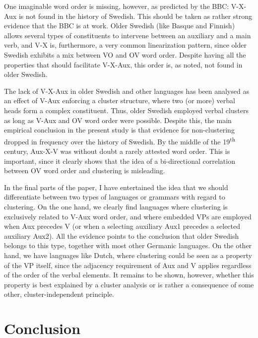 \documentclass[output=paper, colorlinks, citecolor=brown]{langscibook}
\begin{document}
One imaginable word order is missing, however, as predicted by the BBC: V-X-Aux is not found in the history of Swedish. This should be taken as rather strong evidence that the BBC is at work. Older Swedish (like Basque and Finnish) allows several types of constituents to intervene between an auxiliary and a main verb, and V-X is, furthermore, a very common linearization pattern, since older Swedish exhibits a mix between VO and OV word order. Despite having all the properties that should facilitate V-X-Aux, this order is, as noted, not found in older Swedish.



The lack of V-X-Aux in older Swedish and other languages has been analysed as an effect of V-Aux enforcing a cluster structure, where two (or more) verbal heads form a complex constituent. Thus, older Swedish employed verbal clusters as long as V-Aux and OV word order were possible. Despite this, the main empirical conclusion in the present study is that evidence for non-clustering dropped in frequency over the history of Swedish. By the middle of the 19\textsuperscript{th} century, Aux-X-V was without doubt a rarely attested word order. This is important, since it clearly shows that the idea of a bi-directional correlation between OV word order and clustering is misleading.



In the final parts of the paper, I have entertained the idea that we should differentiate between two types of languages or grammars with regard to clustering. On the one hand, we clearly find languages where clustering is exclusively related to V-Aux word order, and where embedded VPs are employed when Aux precedes V (or when a selecting auxiliary Aux1 precedes a selected auxiliary Aux2). All the evidence points to the conclusion that older Swedish belongs to this type, together with most other Germanic languages. On the other hand, we have languages like Dutch, where clustering could be seen as a property of the VP itself, since the adjacency requirement of Aux and V applies regardless of the order of the verbal elements. It remains to be shown, however, whether this property is best explained by a cluster analysis or is rather a consequence of some other, cluster-independent principle.


\section{Conclusion}\label{sec:sangfelt:6}
\end{document}
